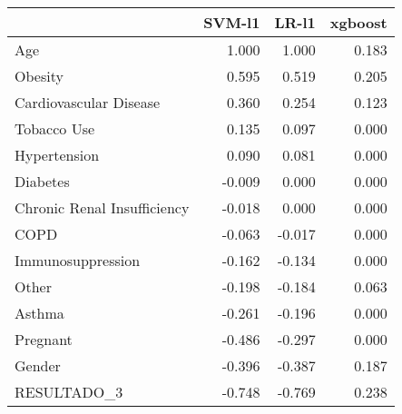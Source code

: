 \begin{tabular}{lrrr}
\toprule
{} &  SVM-l1 &  LR-l1 &  xgboost \\
\midrule
Age                         &   1.000 &  1.000 &    0.183 \\
Obesity                     &   0.595 &  0.519 &    0.205 \\
Cardiovascular Disease      &   0.360 &  0.254 &    0.123 \\
Tobacco Use                 &   0.135 &  0.097 &    0.000 \\
Hypertension                &   0.090 &  0.081 &    0.000 \\
Diabetes                    &  -0.009 &  0.000 &    0.000 \\
Chronic Renal Insufficiency &  -0.018 &  0.000 &    0.000 \\
COPD                        &  -0.063 & -0.017 &    0.000 \\
Immunosuppression           &  -0.162 & -0.134 &    0.000 \\
Other                       &  -0.198 & -0.184 &    0.063 \\
Asthma                      &  -0.261 & -0.196 &    0.000 \\
Pregnant                    &  -0.486 & -0.297 &    0.000 \\
Gender                      &  -0.396 & -0.387 &    0.187 \\
RESULTADO\_3                 &  -0.748 & -0.769 &    0.238 \\
\bottomrule
\end{tabular}
